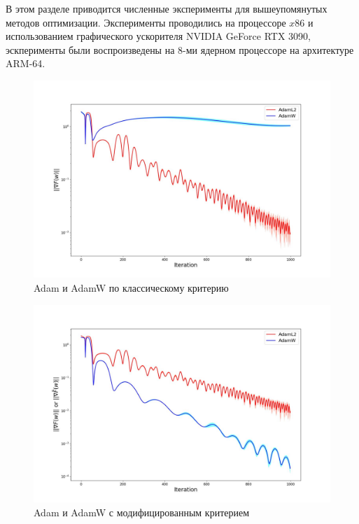 В этом разделе приводится численные эксперименты для вышеупомянутых методов оптимизации. Эксперименты проводились на процессоре $x86$ и использованием графического ускорителя NVIDIA GeForce RTX 3090, эскперименты были воспроизведены на 8-ми ядерном процессоре на архитектуре ARM-64.


\begin{figure}[h!]
\centering
\includegraphics[width=0.7\linewidth]{pictures/fig1.jpg}
\captionsetup{justification=centering,margin=0.5cm}
\caption{Adam и AdamW по классическому критерию}
\label{fig:adams_errors}
\end{figure}

\begin{figure}[h!]
\centering
\includegraphics[width=0.7\linewidth]{pictures/fig2.jpg}
\captionsetup{justification=centering,margin=0.5cm}
\caption{Adam и AdamW с модифицированным критерием}
\label{fig:adams_special_errors}
\end{figure}